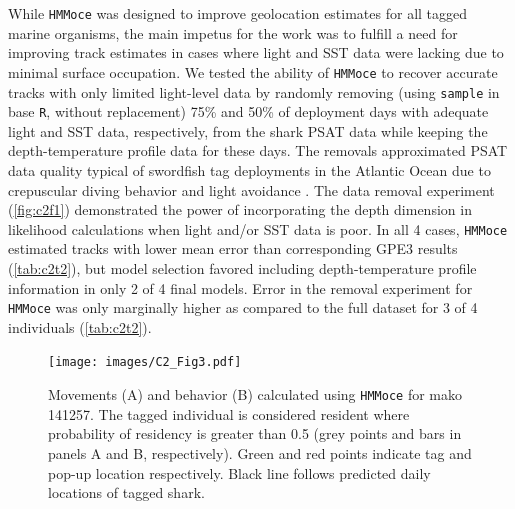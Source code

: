 While \texttt{HMMoce} was designed to improve geolocation estimates for
all tagged marine organisms, the main impetus for the work was to
fulfill a need for improving track estimates in cases where light and
SST data were lacking due to minimal surface occupation. We tested the
ability of \texttt{HMMoce} to recover accurate tracks with only limited
light-level data by randomly removing (using \texttt{sample} in base
\texttt{R}, without replacement) 75\% and 50\% of deployment days with
adequate light and SST data, respectively, from the shark PSAT data
while keeping the depth-temperature profile data for these days. The
removals approximated PSAT data quality typical of swordfish tag
deployments in the Atlantic Ocean due to crepuscular diving behavior and
light avoidance \citep{Braun2015, Neilson2009}. The data removal
experiment (\cref{fig:c2f1}) demonstrated the power of incorporating
the depth dimension in likelihood calculations when light and/or SST
data is poor. In all 4 cases, \texttt{HMMoce} estimated tracks with
lower mean error than corresponding GPE3 results (\cref{tab:c2t2}), but model
selection favored including depth-temperature profile information in
only 2 of 4 final models. Error in the removal experiment for
\texttt{HMMoce} was only marginally higher as compared to the full
dataset for 3 of 4 individuals (\cref{tab:c2t2}).

\begin{figure}[p!]
\centering
\texttt{[image: images/C2\_Fig3.pdf]}
\caption[Movement and behavior results from \texttt{HMMoce}]{Movements (A) and behavior (B) calculated using
\texttt{HMMoce} for mako 141257. The tagged individual is considered
resident where probability of residency is greater than 0.5 (grey points
and bars in panels A and B, respectively). Green and red points indicate
tag and pop-up location respectively. Black line follows predicted daily
locations of tagged shark.}
\label{fig:c2f3}
\end{figure}

